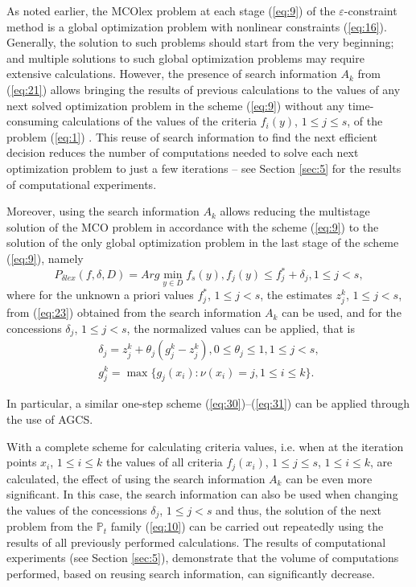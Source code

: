 \documentclass[smallextended]{svjour3}       %
\begin{document}
As noted earlier, the MCOlex problem at each stage (\ref{eq:9}) of the $\varepsilon$-constraint method is a global optimization problem with nonlinear constraints (\ref{eq:16}). Generally, the solution to such problems should start from the very beginning; and multiple solutions to such global optimization problems may require extensive calculations. However, the presence of search information $A_k$ from (\ref{eq:21}) allows bringing the results of previous calculations to the values of any next solved optimization problem in the scheme (\ref{eq:9}) without any time-consuming calculations of the values of the criteria $f_i (y)$, $1 \leq j \leq s$, of the problem (\ref{eq:1}) \cite{c30,c31}. This reuse of search information to find the next efficient decision reduces the number of computations needed to solve each next optimization problem to just a few iterations -- see Section \ref{sec:5} for the results of computational experiments.

Moreover, using the search information $A_k$ allows reducing the multistage solution of the MCO problem in accordance with the scheme (\ref{eq:9}) to the solution of the only global optimization problem in the last stage of the scheme (\ref{eq:9}), namely
\begin{equation}\label{eq:30}
P_{\delta lex} (f,\delta,D)=Arg \min_{y \in D} {f_s(y)}, f_j(y)\leq f_j^* + \delta_j, 1 \leq j < s,
\end{equation}
where for the unknown a priori values $f_j^*$, $1 \leq j < s$, the estimates $z_j^k$, ${1 \leq j < s}$, from (\ref{eq:23}) obtained from the search information $A_k$ can be used, and for the concessions $\delta_j$, $1 \leq j < s$, the normalized values can be applied, that is
\begin{equation}\label{eq:31}
	\begin{matrix}
	\delta_j = z_j^k + \theta_j (g_j^k-z_j^k ), 0 \leq \theta_j \leq 1, 1 \leq j < s,\\
	g_j^k = \max{\{ g_j (x_i ) : \nu(x_i)=j, 1 \leq i \leq k \}}.
	\end{matrix}
\end{equation}

In particular, a similar one-step scheme (\ref{eq:30})--(\ref{eq:31}) can be applied through the use of AGCS.

With a complete scheme for calculating criteria values, i.e. when at the iteration points $x_i$, $1 \leq i \leq k$ the values of all criteria $f_j(x_i)$, $1 \leq j \leq s$, $1 \leq i \leq k$, are calculated, the effect of using the search information $A_k$ can be even more significant. In this case, the search information can also be used when changing the values of the concessions $\delta_j$, $1 \leq j < s$ and thus, the solution of the next problem from the $\mathbb{P}_t$ family (\ref{eq:10}) can be carried out repeatedly using the results of all previously performed calculations. The results of computational experiments (see Section \ref{sec:5}), demonstrate that the volume of computations performed, based on reusing search information, can significantly decrease.
\end{document}

